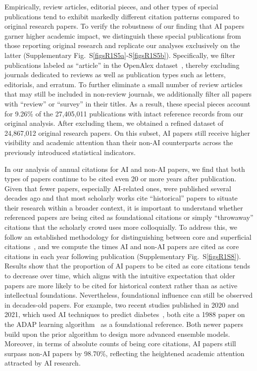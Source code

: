 Empirically, review articles, editorial pieces, and other types of special publications tend to exhibit markedly different citation patterns compared to original research papers.
To verify the robustness of our finding that AI papers garner higher academic impact, we distinguish these special publications from those reporting original research and replicate our analyses exclusively on the latter (Supplementary Fig.~S\ref{figsR1S5a}-S\ref{figsR1S5b}).
Specifically, we filter publications labeled as “article” in the OpenAlex dataset~\supercite{openalex}, thereby excluding journals dedicated to reviews as well as publication types such as letters, editorials, and erratum.
To further eliminate a small number of review articles that may still be included in non-review journals, we additionally filter all papers with “review” or “survey” in their titles.
As a result, these special pieces account for 9.26\% of the 27,405,011 publications with intact reference records from our original analysis.
After excluding them, we obtained a refined dataset of 24,867,012 original research papers.
On this subset, AI papers still receive higher visibility and academic attention than their non-AI counterparts across the previously introduced statistical indicators.

In our analysis of annual citations for AI and non-AI papers, we find that both types of papers continue to be cited even 20 or more years after publication.
Given that fewer papers, especially AI-related ones, were published several decades ago and that most scholarly works cite “historical” papers to situate their research within a broader context, it is important to understand whether referenced papers are being cited as foundational citations or simply “throwaway” citations that the scholarly crowd uses more colloquially.
To address this, we follow an established methodology for distinguishing between core and superficial citations~\supercite{hao2024HLM}, and we compute the times AI and non-AI papers are cited as core citations in each year following publication (Supplementary Fig.~S\ref{figsR1S8}).
Results show that the proportion of AI papers to be cited as core citations tends to decrease over time, which aligns with the intuitive expectation that older papers are more likely to be cited for historical context rather than as active intellectual foundations.
Nevertheless, foundational influence can still be observed in decades-old papers.
For example, two recent studies published in 2020 and 2021, which used AI techniques to predict diabetes~\supercite{hasan2020diabetes,kumari2021ensemble}, both cite a 1988 paper on the ADAP learning algorithm~\supercite{smith1988using} as a foundational reference.
Both newer papers build upon the prior algorithm to design more advanced ensemble models.
Moreover, in terms of absolute counts of being core citations, AI papers still surpass non-AI papers by 98.70\%, reflecting the heightened academic attention attracted by AI research.

